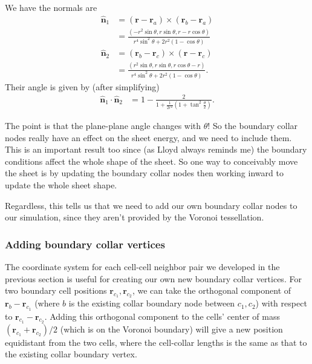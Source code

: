 We have the normals are 
\begin{align*}
    \hat{\bm{n}}_1 &= (\bm{r} - \bm{r}_a) \times (\bm{r}_b - \bm{r}_a) \\
    &= \frac{(-r^2 \sin\theta, r\sin\theta, r - r\cos\theta)}{r^4\sin^2\theta + 2r^2(1-\cos\theta)} \\
    \hat{\bm{n}}_2 &= (\bm{r}_b - \bm{r}_c) \times (\bm{r} - \bm{r}_c)\\
    &= \frac{(r^2 \sin\theta, r\sin\theta, r\cos\theta - r)}{r^4\sin^2\theta + 2r^2(1-\cos\theta)}.
\end{align*}
\noindent Their angle is given by (after simplifying)
\begin{align*}
    \hat{\bm{n}}_1 \cdot \hat{\bm{n}}_2 &= 1 - \frac{2}{1 + \frac{1}{2r^2} \left(1+\tan^2\frac{\theta}{2}\right)}.
\end{align*}

The point is that the plane-plane angle changes with $\theta$! So the boundary collar nodes really have an effect on the sheet energy, and we need to include them. This is an important result too since (as Lloyd always reminds me) the boundary conditions affect the whole shape of the sheet. So one way to conceivably move the sheet is by updating the boundary collar nodes then working inward to update the whole sheet shape. 

Regardless, this tells us that we need to add our own boundary collar nodes to our simulation, since they aren't provided by the Voronoi tessellation.

\subsubsection{Adding boundary collar vertices}

The coordinate system for each cell-cell neighbor pair we developed in the previous section is useful for creating our own new boundary collar vertices. For two boundary cell positions $\bm{r}_{c_1}, \bm{r}_{c_2}$, we can take the orthogonal component of $\bm{r}_{b} - \bm{r}_{c_1}$ (where $b$ is the existing collar boundary node between $c_1, c_2$) with respect to $\bm{r}_{c_1} - \bm{r}_{c_2}$. Adding this orthogonal component to the cells' center of mass $(\bm{r}_{c_1} + \bm{r}_{c_2})/2$ (which is on the Voronoi boundary) will give a new position equidistant from the two cells, where the cell-collar lengths is the same as that to the existing collar boundary vertex. 

